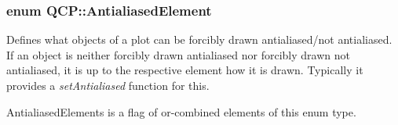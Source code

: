 \subsubsection[{\texorpdfstring{Antialiased\+Element}{AntialiasedElement}}]{\setlength{\rightskip}{0pt plus 5cm}enum {\bf Q\+C\+P\+::\+Antialiased\+Element}}\hypertarget{namespace_q_c_p_ae55dbe315d41fe80f29ba88100843a0c}{}\label{namespace_q_c_p_ae55dbe315d41fe80f29ba88100843a0c}
Defines what objects of a plot can be forcibly drawn antialiased/not antialiased. If an object is neither forcibly drawn antialiased nor forcibly drawn not antialiased, it is up to the respective element how it is drawn. Typically it provides a {\itshape set\+Antialiased} function for this.

{\ttfamily Antialiased\+Elements} is a flag of or-\/combined elements of this enum type.

